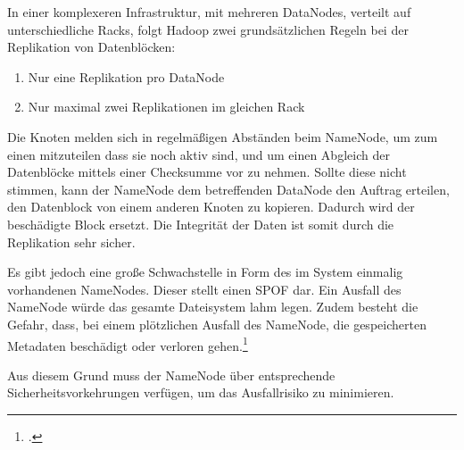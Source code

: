In einer komplexeren Infrastruktur, mit mehreren DataNodes, verteilt auf unterschiedliche Racks, folgt Hadoop zwei grundsätzlichen Regeln bei der Replikation von Datenblöcken:

\begin{enumerate}
	\item Nur eine Replikation pro DataNode
	\item Nur maximal zwei Replikationen im gleichen Rack
\end{enumerate}

\newpage
Die Knoten melden sich in regelmäßigen Abständen beim NameNode, um zum einen mitzuteilen dass sie noch aktiv sind, und um einen Abgleich der Datenblöcke mittels einer Checksumme vor zu nehmen. Sollte diese nicht stimmen, kann der NameNode dem betreffenden DataNode den Auftrag erteilen, den Datenblock von einem anderen Knoten zu kopieren. Dadurch wird der beschädigte Block ersetzt. Die Integrität der Daten ist somit durch die Replikation sehr sicher.

Es gibt jedoch eine große Schwachstelle in Form des im System einmalig vorhandenen NameNodes. Dieser stellt einen \ac{SPOF} dar. Ein Ausfall des NameNode würde das gesamte Dateisystem lahm legen. Zudem besteht die Gefahr, dass, bei einem plötzlichen Ausfall des NameNode, die gespeicherten Metadaten beschädigt oder verloren gehen.\footcite[Vgl.][S. 277 f.]{Wartala.2012}

Aus diesem Grund muss der NameNode über entsprechende Sicherheitsvorkehrungen verfügen, um das Ausfallrisiko zu minimieren.


